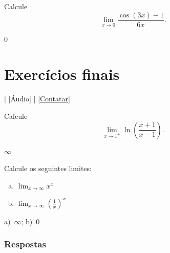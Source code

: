 \begin{exer}
  Calcule
  \begin{equation}
    \lim_{x\to 0} \frac{\cos(3x)-1}{6x}.
  \end{equation}
\end{exer}
\begin{resp}
  $0$
\end{resp}

\section{Exercícios finais}\label{cap_lim_sec_exfinal}

\begin{flushright}
  [Vídeo] | [Áudio] | \href{https://phkonzen.github.io/notas/contato.html}{[Contatar]}
\end{flushright}

\begin{exer}
  Calcule
  \begin{equation}
    \lim_{x\to 1^+} \ln\left(\frac{x+1}{x-1}\right).
  \end{equation}
\end{exer}
\begin{resp}
  $\infty$
\end{resp}

\begin{exer}
  Calcule os seguintes limites:
  \begin{enumerate}[a)]
  \item $\displaystyle\lim_{x\to\infty} x^x$
  \item $\displaystyle\lim_{x\to\infty} \left(\frac{1}{x}\right)^x$
  \end{enumerate}
\end{exer}
\begin{resp}
  a)~$\infty$; b)~$0$
\end{resp}

\ifisbook
\subsubsection{Respostas}
\shipoutAnswer
\fi